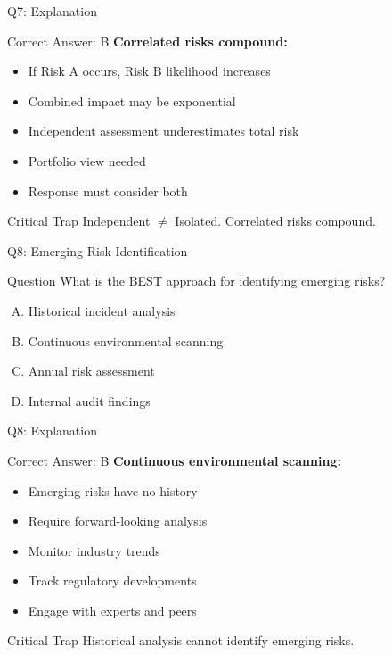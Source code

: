 \documentclass{beamer}
\begin{document}
			\begin{frame}{Q7: Explanation}
				\begin{block}{Correct Answer: B}
					\textbf{Correlated risks compound:}
					\begin{itemize}
						\item If Risk A occurs, Risk B likelihood increases
						\item Combined impact may be exponential
						\item Independent assessment underestimates total risk
						\item Portfolio view needed
						\item Response must consider both
					\end{itemize}
				\end{block}
				\begin{alertblock}{Critical Trap}
					Independent $\neq$ Isolated. Correlated risks compound.
				\end{alertblock}
			\end{frame}
			
			\begin{frame}{Q8: Emerging Risk Identification}
				\begin{block}{Question}
					What is the BEST approach for identifying emerging risks?
				\end{block}
				\begin{enumerate}[(A)]
					\item Historical incident analysis
					\item Continuous environmental scanning
					\item Annual risk assessment
					\item Internal audit findings
				\end{enumerate}
			\end{frame}
			
			\begin{frame}{Q8: Explanation}
				\begin{block}{Correct Answer: B}
					\textbf{Continuous environmental scanning:}
					\begin{itemize}
						\item Emerging risks have no history
						\item Require forward-looking analysis
						\item Monitor industry trends
						\item Track regulatory developments
						\item Engage with experts and peers
					\end{itemize}
				\end{block}
				\begin{alertblock}{Critical Trap}
					Historical analysis cannot identify emerging risks.
				\end{alertblock}
			\end{frame}
			
\end{document}
